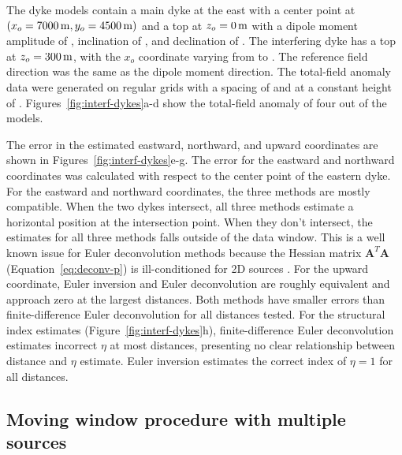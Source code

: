 The dyke models contain a main dyke at the east with a center point at
$(x_o=\SynInterfDykesTrueEast, y_o=\SynInterfDykesTrueNorth)$ and a top at
$z_o=\SynInterfDykesTrueUp$ with a dipole moment amplitude
of \SynInterfDykesInt{}, inclination of \SynInterfDykesInc, and declination of
\SynInterfDykesDec.
The interfering dyke has a top at $z_o=\SynInterfDykesInterfUp$, with the $x_o$
coordinate varying from
\SynInterfDykesInterfEastMin{} to \SynInterfDykesInterfEastMax{}.
The reference field direction was the same as the dipole moment direction.
The total-field anomaly data were generated on regular grids with a spacing of
\SynInterfDykesSpacing{} and at a constant height of \SynInterfDykesHeight.
Figures~\ref{fig:interf-dykes}a-d show the total-field anomaly of four out of
the \SynInterfDykesNModels{} models.

The error in the estimated eastward, northward, and upward coordinates are
shown in Figures~\ref{fig:interf-dykes}e-g.
The error for the eastward and northward coordinates was calculated with
respect to the center point of the eastern dyke.
For the eastward and northward coordinates, the three methods are mostly
compatible.
When the two dykes intersect, all three methods estimate a horizontal position
at the intersection point.
When they don't intersect, the estimates for all three methods falls outside of
the data window.
This is a well known issue for Euler deconvolution methods because the Hessian
matrix $\mathbf{A}^T\mathbf{A}$ (Equation~\ref{eq:deconv-p}) is ill-conditioned
for 2D sources \citep{Mushayandebvu2004}.
For the upward coordinate, Euler inversion and Euler deconvolution are
roughly equivalent and approach zero at the largest distances.
Both methods have smaller errors than finite-difference Euler deconvolution for
all distances tested.
For the structural index estimates (Figure~\ref{fig:interf-dykes}h),
finite-difference Euler deconvolution estimates incorrect $\eta$ at most
distances, presenting no clear relationship between distance and $\eta$
estimate.
Euler inversion estimates the correct index of $\eta=1$ for all distances.


\subsection{Moving window procedure with multiple sources}
\label{sec:windows}

